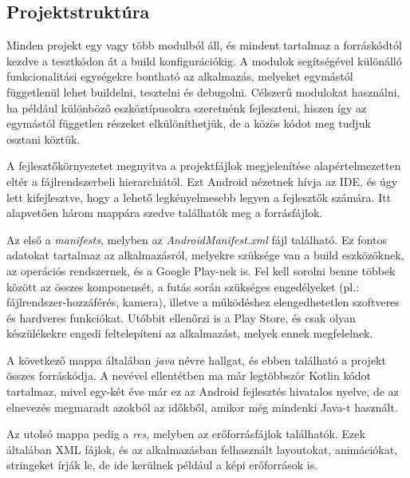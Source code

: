 \subsection{Projektstruktúra}
Minden projekt egy vagy több modulból áll, és mindent tartalmaz a forráskódtól kezdve a tesztkódon át a build konfigurációkig. A modulok segítségével különálló funkcionalitási egységekre bontható az alkalmazás, melyeket egymástól függetlenül lehet buildelni, tesztelni és debugolni. \cite{ProjectStructure}
Célszerű modulokat használni, ha például különböző eszköztípusokra szeretnénk fejleszteni, hiszen így az egymástól független részeket elkülöníthetjük, de a közös kódot meg tudjuk osztani köztük.

A fejlesztőkörnyezetet megnyitva a projektfájlok megjelenítése alapértelmezetten eltér a fájlrendszerbeli hierarchiától. Ezt Android nézetnek hívja az IDE, és úgy lett kifejlesztve, hogy a lehető legkényelmesebb legyen a fejlesztők számára. Itt alapvetően három mappára szedve találhatók meg a forrásfájlok.

Az első a \emph{manifests}, melyben az \emph{AndroidManifest.xml} fájl található. Ez fontos adatokat tartalmaz az alkalmazásról, melyekre szüksége van a build eszközöknek, az operációs rendszernek, és a Google Play-nek is. Fel kell sorolni benne többek között az összes komponensét, a futás során szükséges engedélyeket (pl.: fájlrendszer-hozzáférés, kamera), illetve a működéshez elengedhetetlen szoftveres és hardveres funkciókat. Utóbbit ellenőrzi is a Play Store, és csak olyan készülékekre engedi feltelepíteni az alkalmazást, melyek ennek megfelelnek. \cite{Manifest}

A következő mappa általában \emph{java} névre hallgat, és ebben található a projekt összes forráskódja. A nevével ellentétben ma már legtöbbször Kotlin kódot tartalmaz, mivel egy-két éve már ez az Android fejlesztés hivatalos nyelve, de az elnevezés megmaradt azokból az időkből, amikor még mindenki Java-t használt.


Az utolsó mappa pedig a \emph{res}, melyben az erőforrásfájlok találhatók. Ezek általában XML fájlok, és az alkalmazásban felhasznált layoutokat, animációkat, stringeket írják le, de ide kerülnek például a képi erőforrások is.
